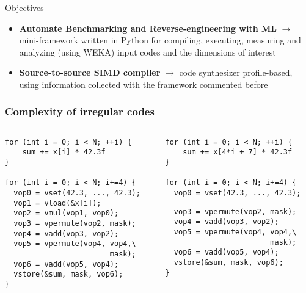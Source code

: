 \documentclass[xcolor=table,hideothersubsections,aspectratio=1610]{beamer}
\begin{document}
\begin{frame}{Objectives}
\begin{itemize}
    \item \textbf{Automate Benchmarking and Reverse-engineering with ML} $\rightarrow$ mini-framework written in Python for compiling, executing, measuring and analyzing (using WEKA) input codes and the dimensions of interest
    \item \textbf{Source-to-source SIMD compiler} $\rightarrow$ code synthesizer profile-based, using information collected with the framework commented before
\end{itemize}
\end{frame}



\begin{frame}[fragile]
\frametitle{Complexity of irregular codes}
\begin{columns}
\small
\begin{column}{0.45\textwidth}
\begin{verbatim}
for (int i = 0; i < N; ++i) {
    sum += x[i] * 42.3f
}
--------
for (int i = 0; i < N; i+=4) {
  vop0 = vset(42.3, ..., 42.3);
  vop1 = vload(&x[i]);
  vop2 = vmul(vop1, vop0);
  vop3 = vpermute(vop2, mask);
  vop4 = vadd(vop3, vop2);
  vop5 = vpermute(vop4, vop4,\ 
                        mask);
  vop6 = vadd(vop5, vop4);
  vstore(&sum, mask, vop6);
}




\end{verbatim}
\end{column}
\begin{column}{0.45\textwidth}  %
\begin{verbatim}
for (int i = 0; i < N; ++i) {
    sum += x[4*i + 7] * 42.3f
}
--------
for (int i = 0; i < N; i+=4) {
  vop0 = vset(42.3, ..., 42.3);\end{verbatim}
{
}
\vspace{-.55cm}
\begin{verbatim}
  vop3 = vpermute(vop2, mask);
  vop4 = vadd(vop3, vop2);
  vop5 = vpermute(vop4, vop4,\ 
                        mask);
  vop6 = vadd(vop5, vop4);
  vstore(&sum, mask, vop6);
}


\end{verbatim}

\end{column}
\end{columns}
\end{frame}
\end{document}
